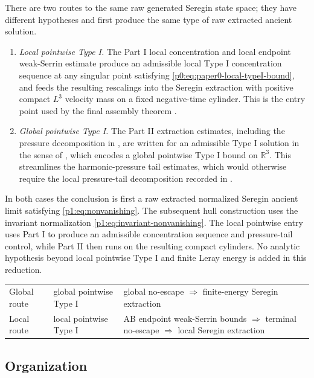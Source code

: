 \documentclass[11pt]{amsart}
\theoremstyle{plain}
\theoremstyle{definition}
\theoremstyle{remark}
\numberwithin{equation}{section}
\newcommand{\R}{\mathbb R}
\begin{document}
There are two routes to the same raw generated Seregin state space; they have
different hypotheses and first produce the same type of raw extracted ancient
solution.
\begin{enumerate}[label=\textup{(\arabic*)}]
\item \emph{Local pointwise Type I.}  The Part I local concentration and
local endpoint weak-Serrin estimate 
produce an admissible local Type I concentration sequence at any singular point
satisfying \eqref{p0:eq:paper0-local-typeI-bound}, and
 feeds the resulting
rescalings into the Seregin extraction with positive compact \(L^3\)
velocity mass on a fixed negative-time cylinder.  This is the entry point
used by the final assembly theorem .
\item \emph{Global pointwise Type I.}  The Part II extraction estimates,
including the pressure decomposition in , are written
for an admissible Type I solution in the sense of
, which encodes a global pointwise Type I
bound on \(\R^3\).  This streamlines the harmonic-pressure tail estimates,
which would otherwise require the local pressure-tail decomposition recorded
in .
\end{enumerate}
In both cases the conclusion is first a raw extracted normalized Seregin
ancient limit satisfying \eqref{p1:eq:nonvanishing}.  The subsequent hull
construction uses the
invariant normalization \eqref{p1:eq:invariant-nonvanishing}.  The local
pointwise entry uses Part I to produce
an admissible concentration sequence and pressure-tail control, while Part II
then runs on the resulting compact cylinders.  No analytic hypothesis beyond
local pointwise Type I and finite Leray energy is added in this reduction.

\begin{center}
\begin{tabular}{p{}p{}p{}}
Global route & global pointwise Type I &
global no-escape \(\Rightarrow\) finite-energy Seregin extraction \\
Local route & local pointwise Type I &
AB endpoint weak-Serrin bounds \(\Rightarrow\) terminal no-escape
\(\Rightarrow\) local Seregin extraction
\end{tabular}
\end{center}

\subsection{Organization}
\end{document}
